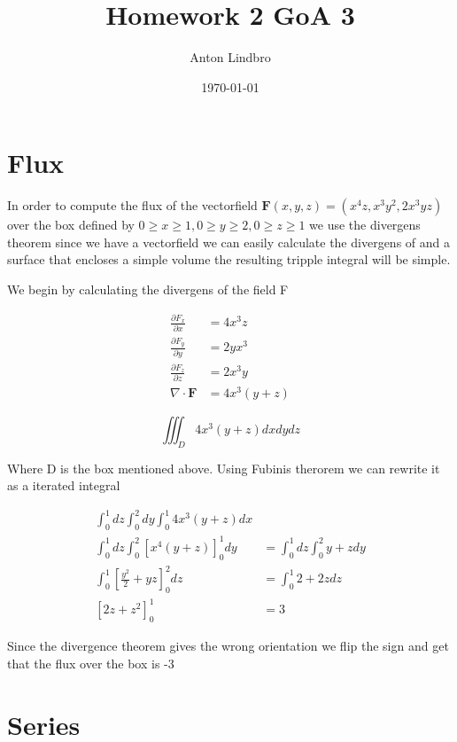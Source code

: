 \documentclass[a4paper]{article}
\title{Homework 2 GoA 3}
\author{Anton Lindbro}
\date{\today}
\begin{document}
\maketitle

\section*{Flux}

In order to compute the flux of the vectorfield $\boldsymbol{F}(x,y,z)=(x^4z,x^3y^2,2x^3yz)$ over the box defined by $0\geq x \geq 1, 0 \geq y \geq 2, 0 \geq z \geq 1$ we use the divergens theorem since we have a vectorfield we can easily calculate the divergens of and a surface that encloses a simple volume the resulting tripple integral will be simple. 

We begin by calculating the divergens of the field F

\begin{align}
    \frac{\partial F_x}{\partial x} &= 4x^3z \\
    \frac{\partial F_y}{\partial y} &= 2yx^3 \\
    \frac{\partial F_z}{\partial z} &= 2x^3y \\
    \nabla \cdot \boldsymbol{F} &= 4x^3(y+z)
\end{align}

\begin{equation}
    \iiint_D 4x^3(y+z) dxdydz
\end{equation}

Where D is the box mentioned above. Using Fubinis therorem we can rewrite it as a iterated integral

\begin{align}
    \int_0^1 dz \int_0^2 dy \int_0^1 4x^3(y+z) dx  \\
    \int_0^1 dz \int_0^2 \left [x^4(y+z)\right ]_0^1 dy &= \int_0^1 dz \int_0^2 y+z dy \\
    \int_0^1 \left [ \frac{y^2}{2}+yz \right ]_0^2 dz &= \int_0^1 2+2z dz \\
    \left [ 2z + z^2 \right ]_0^1 &= 3
\end{align}

Since the divergence theorem gives the wrong orientation we flip the sign and get that the flux over the box is -3

\section*{Series}
\end{document}
